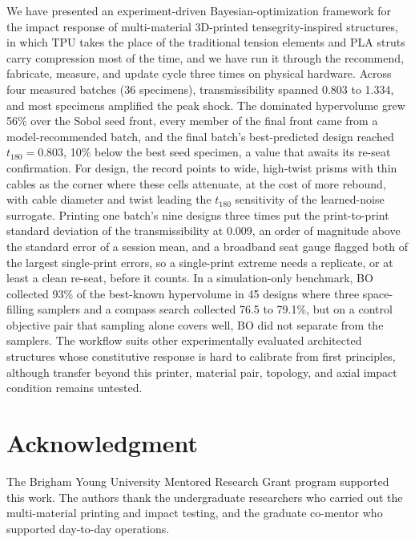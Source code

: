 \documentclass[lineno,nocopyright,upint,varvw,hyphenate]{asmejour}
\begin{document}
We have presented an experiment-driven Bayesian-optimization framework
for the impact response of multi-material 3D-printed tensegrity-inspired
structures, in which TPU takes the place of the traditional tension
elements and PLA struts carry compression most of the time, and we have
run it through the recommend, fabricate, measure, and update cycle three
times on physical hardware. Across four measured
batches (36 specimens), transmissibility spanned 0.803 to 1.334, and most
specimens amplified the peak shock. The dominated hypervolume grew 56\%
over the Sobol seed front, every member of the final front came from a
model-recommended batch, and the final batch's best-predicted design
reached $t_{180} = 0.803$, 10\% below the best seed specimen, a value
that awaits its re-seat confirmation. For design, the record points to
wide, high-twist prisms with thin cables as the corner where these cells
attenuate, at the cost of more rebound, with cable diameter and twist
leading the $t_{180}$ sensitivity of the learned-noise surrogate. Printing one batch's nine designs
three times put the print-to-print standard deviation of the
transmissibility at 0.009, an order of magnitude above the standard
error of a session mean, and a broadband seat gauge flagged both of the
largest single-print errors, so a single-print extreme needs a
replicate, or at least a clean re-seat, before it counts. In a
simulation-only benchmark, BO collected 93\% of the best-known
hypervolume in 45 designs where three space-filling samplers and a compass search collected 76.5 to
79.1\%, but on a control objective pair that sampling alone covers well,
BO did not separate from the samplers. The workflow suits other
experimentally evaluated architected structures whose constitutive
response is hard to calibrate from first principles, although transfer
beyond this printer, material pair, topology, and axial impact condition
remains untested.


\section*{Acknowledgment} %

The Brigham Young University Mentored Research Grant program supported
this work. The authors thank the undergraduate researchers
who carried out the multi-material printing and impact testing, and the
graduate co-mentor who supported day-to-day operations.
\end{document}

